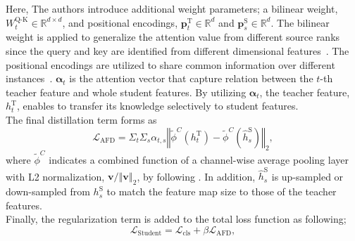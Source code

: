 \documentclass{article}
\begin{document}
	Here, The authors introduce additional weight parameters; a bilinear weight, $W_t^{\text{Q-K}}\in \mathbb{R}^{d \times d}$, and positional encodings, $\mathbf{p}_{t}^{\text{T}} \in  \mathbb{R}^{d}$ and $\mathbf{p}_{s}^{\text{S}}\in  \mathbb{R}^{d}$. The bilinear weight is applied to generalize the attention value from different source ranks since the query and key are identified from different dimensional features~\cite{bilinear-1,bilinear-2}. The positional encodings are utilized to share common information over different instances~\cite{transformer}. $\mathbf{\alpha}_t$ is the attention vector that capture relation between the $t$-th teacher feature and whole student features. By utilizing $\mathbf{\alpha}_t$, the teacher feature, ${h}^{\text{T}}_t$, enables to transfer its knowledge selectively to student features.\\
	The final distillation term forms as
	\begin{equation}
		\mathcal{L}_{\text{AFD}} = \Sigma_{t}{\Sigma_{s}{ \alpha_{t,s} \left\Vert
				\tilde{\phi}^{C}({h}^{\text{T}}_t) - \tilde{\phi}^{C}(\hat{h}^{\text{S}}_s)
				\right\Vert_2 }},
		\label{eq:sad_loss}
	\end{equation}
	where $\tilde{\phi}^{C}$ indicates a combined function of a channel-wise average pooling layer with L2 normalization, $\mathbf{v}/\left\Vert \mathbf{v} \right\Vert_2$, by following \cite{atts}. In addition, $\hat{h}^{\text{S}}_s$ is up-sampled or down-sampled from $h^{\text{S}}_s$ to match the feature map size to those of the teacher features. \\
	Finally, the regularization term is added to the total loss function as following;
	\begin{equation}
		\mathcal{L}_{\text{Student}} = \mathcal{L}_{\text{cls}} + \beta \mathcal{L}_{\text{AFD}},
	\end{equation}
\end{document}
